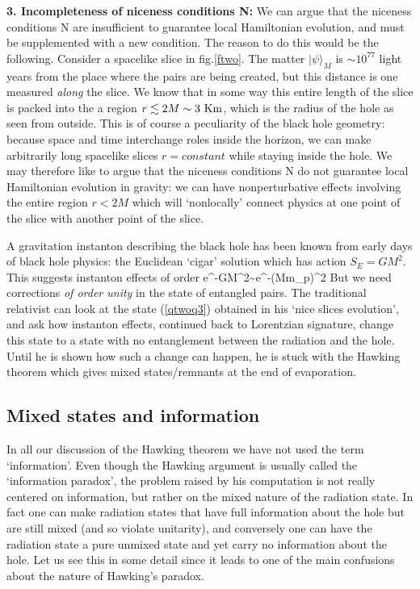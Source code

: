 \documentclass[12pt]{article}
\begin{document}
\b

{\bf 3. Incompleteness of niceness conditions N:} We can argue that the niceness conditions N are insufficient to guarantee local Hamiltonian evolution, and must be supplemented with a new condition. The reason to do this would be the following. Consider a spacelike slice in fig.\ref{ftwo}. The matter $|\psi\rangle_M$ is $\sim 10^{77}$ light years from the place where the pairs are being created, but this  distance is one measured {\it along} the slice. We know that in some way this entire length of the slice is packed into the a  region $r\lesssim 2M\sim 3~{\rm Km}$, which is the radius of the hole as seen from outside. This is of course a peculiarity of the black hole geometry: because space and time interchange roles inside the horizon, we can make arbitrarily long spacelike slices $r=constant$ while staying inside the hole. We may therefore like to argue that the niceness conditions N do not guarantee local Hamiltonian evolution in gravity: we can have nonperturbative effects involving the entire region $r<2M$ which will `nonlocally' connect physics at one point of the slice with another point of the slice.

A gravitation instanton describing the black hole has been known from early days of black hole physics: the Euclidean `cigar' solution which has action
$
S_E=GM^2
\label{el}
$.
This suggests instanton effects of order
\be
 e^{-GM^2}\sim e^{-({M\over m_p})^2}
 \label{action}
\ee
But we need corrections {\it of order unity} in the state of entangled pairs. 
The traditional relativist can look at the state (\ref{qtwoq3}) obtained in his `nice slices evolution', and ask how instanton effects, continued back to Lorentzian signature, change this state to a state with no entanglement between the radiation and the hole. Until he is shown how such a change can happen, he is stuck with the Hawking theorem which gives mixed states/remnants at the end of evaporation.

\subsection{Mixed states and information}

In all our discussion of the Hawking theorem we have not used the term `information'. Even though the Hawking argument is usually called the `information paradox', the problem raised by his computation is not really centered on information, but rather on the mixed nature of the radiation state. In fact one can make radiation states that have full information about the hole but are still mixed  (and so violate unitarity), and conversely one can have the radiation state a pure unmixed state and yet carry no information about the hole. Let us see this in some detail since it leads to one of the main confusions about the nature of Hawking's paradox.
\end{document}
